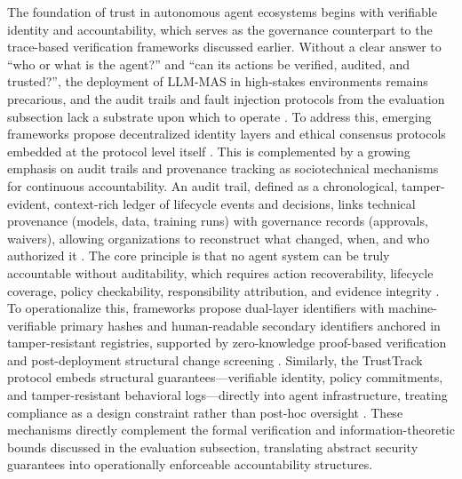 \documentclass[11pt]{article}
\begin{document}
The foundation of trust in autonomous agent ecosystems begins with verifiable identity and accountability, which serves as the governance counterpart to the trace-based verification frameworks discussed earlier. Without a clear answer to ``who or what is the agent?'' and ``can its actions be verified, audited, and trusted?'', the deployment of LLM-MAS in high-stakes environments remains precarious, and the audit trails and fault injection protocols from the evaluation subsection lack a substrate upon which to operate \cite{ref461}. To address this, emerging frameworks propose decentralized identity layers and ethical consensus protocols embedded at the protocol level itself \cite{ref461}. This is complemented by a growing emphasis on audit trails and provenance tracking as sociotechnical mechanisms for continuous accountability. An audit trail, defined as a chronological, tamper-evident, context-rich ledger of lifecycle events and decisions, links technical provenance (models, data, training runs) with governance records (approvals, waivers), allowing organizations to reconstruct what changed, when, and who authorized it \cite{ref462}. The core principle is that no agent system can be truly accountable without auditability, which requires action recoverability, lifecycle coverage, policy checkability, responsibility attribution, and evidence integrity \cite{ref463}. To operationalize this, frameworks propose dual-layer identifiers with machine-verifiable primary hashes and human-readable secondary identifiers anchored in tamper-resistant registries, supported by zero-knowledge proof-based verification and post-deployment structural change screening \cite{ref464}. Similarly, the TrustTrack protocol embeds structural guarantees---verifiable identity, policy commitments, and tamper-resistant behavioral logs---directly into agent infrastructure, treating compliance as a design constraint rather than post-hoc oversight \cite{ref465}. These mechanisms directly complement the formal verification and information-theoretic bounds discussed in the evaluation subsection, translating abstract security guarantees into operationally enforceable accountability structures.
\end{document}
